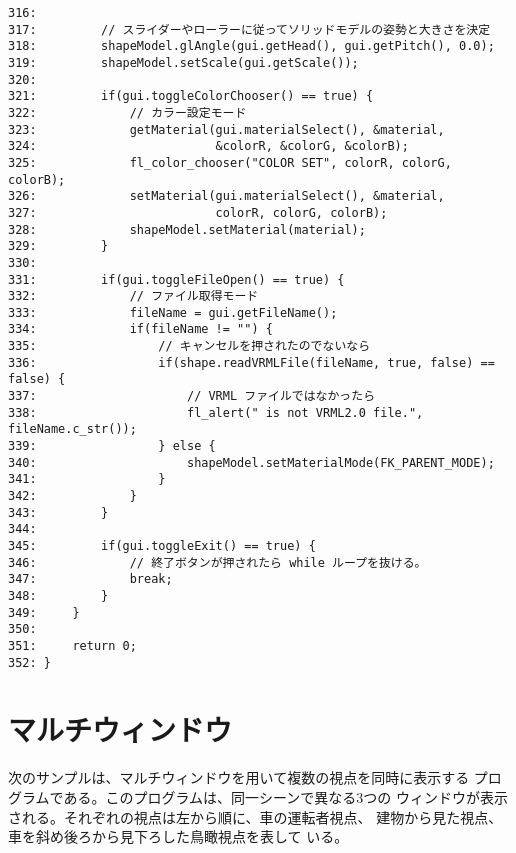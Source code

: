 \begin{breakbox}
\begin{verbatim}
316: 
317:         // スライダーやローラーに従ってソリッドモデルの姿勢と大きさを決定
318:         shapeModel.glAngle(gui.getHead(), gui.getPitch(), 0.0);
319:         shapeModel.setScale(gui.getScale());
320: 
321:         if(gui.toggleColorChooser() == true) {
322:             // カラー設定モード
323:             getMaterial(gui.materialSelect(), &material,
324:                         &colorR, &colorG, &colorB);
325:             fl_color_chooser("COLOR SET", colorR, colorG, colorB);
326:             setMaterial(gui.materialSelect(), &material,
327:                         colorR, colorG, colorB);
328:             shapeModel.setMaterial(material);
329:         }
330: 
331:         if(gui.toggleFileOpen() == true) {
332:             // ファイル取得モード
333:             fileName = gui.getFileName();
334:             if(fileName != "") {
335:                 // キャンセルを押されたのでないなら
336:                 if(shape.readVRMLFile(fileName, true, false) == false) {
337:                     // VRML ファイルではなかったら
338:                     fl_alert(" is not VRML2.0 file.", fileName.c_str());
339:                 } else {
340:                     shapeModel.setMaterialMode(FK_PARENT_MODE);
341:                 }
342:             }
343:         }
344: 
345:         if(gui.toggleExit() == true) {
346:             // 終了ボタンが押されたら while ループを抜ける。
347:             break;
348:         }
349:     }
350: 
351:     return 0;
352: }
\end{verbatim}
\end{breakbox}
\section{マルチウィンドウ}
次のサンプルは、マルチウィンドウを用いて複数の視点を同時に表示する
プログラムである。このプログラムは、同一シーンで異なる3つの
ウィンドウが表示される。それぞれの視点は左から順に、車の運転者視点、
建物から見た視点、車を斜め後ろから見下ろした鳥瞰視点を表して
いる。

